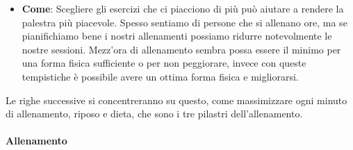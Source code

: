 \documentclass[12pt]{book} %
\begin{document}
\begin{itemize}
\item \textbf{Come}: Scegliere gli esercizi che ci piacciono di più può aiutare a rendere la palestra più piacevole. Spesso sentiamo di persone che si allenano ore, ma se pianifichiamo bene i nostri allenamenti possiamo ridurre notevolmente le nostre sessioni. Mezz'ora di allenamento sembra possa essere il minimo per una forma fisica sufficiente o per non peggiorare, invece con queste tempistiche è possibile avere un ottima forma fisica e migliorarsi.
\end{itemize}

Le righe successive si concentreranno su questo, come massimizzare ogni minuto di allenamento, riposo e dieta, che sono i tre pilastri dell'allenamento.

\paragraph{Allenamento}
\end{document}
